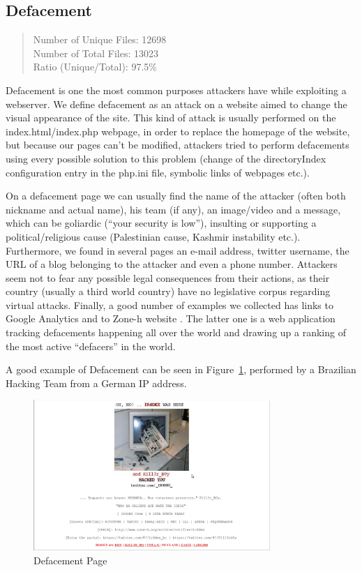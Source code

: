 \subsection{Defacement}

\begin{quote}
Number of Unique Files: 12698\\
Number of Total Files: 13023\\
Ratio (Unique/Total): 97.5\%
\end{quote}

Defacement is one the most common purposes attackers have while exploiting a webserver. We define defacement as an attack on a website aimed to change the visual appearance of the site. This kind of attack is usually performed on the index.html/index.php webpage, in order to replace the homepage of the website, but because our pages can't be modified, attackers tried to perform defacements using every possible solution to this problem (change of the directoryIndex configuration entry in the php.ini file, symbolic links of webpages etc.).

On a defacement page we can usually find the name of the attacker (often both nickname and actual name), his team (if any), an image/video and a message, which can be goliardic (``your security is low''), insulting or supporting a political/religious cause (Palestinian cause, Kashmir instability etc.). Furthermore, we found in several pages an e-mail address, twitter username, the URL of a blog belonging to the attacker and even a phone number. Attackers seem not to fear any possible legal consequences from their actions, as their country (usually a third world country) have no legislative corpus regarding virtual attacks. Finally, a good number of examples we collected has links to Google Analytics and to Zone-h website \cite{zoneh}. The latter one is a web application tracking defacements happening all over the world and drawing up a ranking of the most active ``defacers'' in the world.

A good example of Defacement can be seen in Figure~\ref{fig:defacement}, performed by a Brazilian Hacking Team from a German IP address.

\begin{figure}[H]
\centerline{\includegraphics[width=0.8\textwidth]{Images/defacement.jpg}}
\caption{Defacement Page\label{fig:defacement}}
\end{figure}

